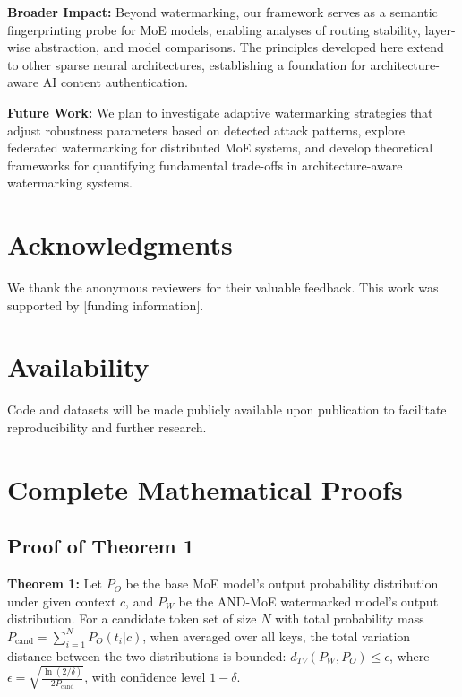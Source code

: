 \documentclass[letterpaper,twocolumn,10pt]{article}
\begin{document}
\textbf{Broader Impact:} Beyond watermarking, our framework serves as a semantic fingerprinting probe for MoE models, enabling analyses of routing stability, layer-wise abstraction, and model comparisons. The principles developed here extend to other sparse neural architectures, establishing a foundation for architecture-aware AI content authentication.

\textbf{Future Work:} We plan to investigate adaptive watermarking strategies that adjust robustness parameters based on detected attack patterns, explore federated watermarking for distributed MoE systems, and develop theoretical frameworks for quantifying fundamental trade-offs in architecture-aware watermarking systems.

\section*{Acknowledgments}

We thank the anonymous reviewers for their valuable feedback. This work was supported by [funding information].

\section*{Availability}

Code and datasets will be made publicly available upon publication to facilitate reproducibility and further research.

\appendix

\section{Complete Mathematical Proofs}
\label{app:proofs}

\subsection{Proof of Theorem 1}

\textbf{Theorem 1:} Let $P_O$ be the base MoE model's output probability distribution under given context $c$, and $P_W$ be the AND-MoE watermarked model's output distribution. For a candidate token set of size $N$ with total probability mass $P_{\text{cand}} = \sum_{i=1}^N P_O(t_i|c)$, when averaged over all keys, the total variation distance between the two distributions is bounded: $d_{TV}(P_W, P_O) \le \epsilon$, where $\epsilon = \sqrt{\frac{\ln(2/\delta)}{2 P_{\text{cand}}}}$, with confidence level $1-\delta$.
\end{document}
